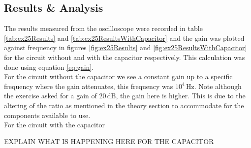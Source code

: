\documentclass[%
reprint,
amsmath,amssymb,
aps,
floatfix
]{revtex4-2}
\begin{document}
		\subsection{Results \& Analysis}
		The results measured from the oscilloscope were recorded in table \ref{tab:ex25Results} and \ref{tab:ex25ResultsWithCapacitor} and the gain was plotted against frequency in figures \ref{fig:ex25Results} and \ref{fig:ex25ResultsWithCapacitor} for the circuit without and with the capacitor respectively. This calculation was done using equation \ref{eq:gain}.\\
		
		For the circuit without the capacitor we see a constant gain up to a specific frequency where the gain attenuates, this frequency was $10^4\,\text{Hz}$. Note although the exercise asked for a gain of $20\,\text{dB}$, the gain here is higher. This is due to the altering of the ratio as mentioned in the theory section to accommodate for the components available to use.\\
		
		For the circuit with the capacitor
		
		EXPLAIN WHAT IS HAPPENING HERE FOR THE CAPACITOR
		
		\begin{table}[]
			\caption{The data measured using the oscilloscope for exercise 25.}
			\label{tab:ex25Results}
		\end{table}
	
\end{document}
